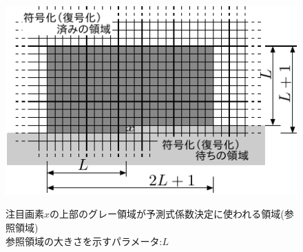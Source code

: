 \documentclass[25pt,landscape,dvipdfmx,uplatex]{foils}
\begin{document}
\begin{figure}
\begin{center}
\includegraphics[width=20.5cm]{fig/fig2.pdf}
\end{center}
{\small 注目画素$x$の上部のグレー領域が予測式係数決定に使われる領域(参照領域)\\
参照領域の大きさを示すパラメータ:$L$}
\end{figure}
\newpage
\end{document}
